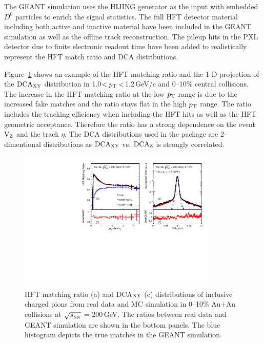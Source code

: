 \documentclass[%
 reprint,	
 amsmath,amssymb,
 aps,
 prc,
]{revtex4-1}
\begin{document}
The GEANT simulation uses the HIJING generator as the input with embedded $D^0$ particles to enrich the signal statistics. The full HFT detector material including both active and inactive material have been included in the GEANT simulation as well as the offline track reconstruction. The pileup hits in the PXL detector due to finite electronic readout time have been added to realistically represent the HFT match ratio and DCA distributions.

Figure~\ref{fig:HijingRatioDca} shows an example of the HFT matching ratio and the 1-D projection of the $\textup{DCA}_{\textup{XY}}$ distribution in 1.0$<p_{\rm T}<$1.2\,GeV/$c$ and 0--10\% central collisions. The increase in the HFT matching ratio at the low $p_{\rm T}$ range is due to the increased fake matches and the ratio stays flat in the high $p_{\rm T}$ range. The ratio includes the tracking efficiency when including the HFT hits as well as the HFT geometric acceptance. Therefore the ratio has a strong dependence on the event $\textup{V}_\textup{Z}$ and the track $\eta$. The DCA distributions used in the package are 2-dimentional distributions as $\textup{DCA}_{\textup{XY}}$ vs. $\textup{DCA}_\textup{Z}$ is strongly correlated.

\begin{figure}
\centering
\includegraphics[width=0.85\textwidth]{fig/HijingRatioDca.pdf}
\caption{HFT matching ratio (a) and DCA$_{\rm XY}$ (c) distributions of inclusive charged pions from real data and MC simulation in 0--10\% Au+Au collisions at $\sqrt{s_{_{\rm NN}}}$ = 200\,GeV. The ratios between real data and GEANT simulation are shown in the bottom panels. The blue histogram depicts the true matches in the GEANT simulation.}
\label{fig:HijingRatioDca} 
\end{figure}
\end{document}
